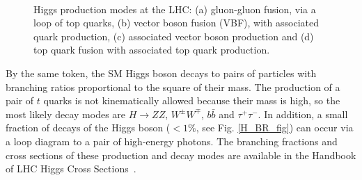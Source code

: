   \begin{figure}[h!]

  \centering
  \\
  \caption{Higgs production modes at the LHC: (a) gluon-gluon fusion, via a loop of top quarks, (b) vector boson fusion (VBF), with associated quark production, (c) associated vector boson production and (d) top quark fusion with associated top quark production. }
  \label{fig:theory:higgsproduction}
  \end{figure}

  \newpage
  By the same token, the SM Higgs boson decays to pairs of particles with branching ratios proportional to the square of their mass. The production of a pair of $t$ quarks is not kinematically allowed because their mass is high, so the most likely decay modes are $H \rightarrow ZZ \text{, } W^{\pm}W^{\mp}$, $ b\bar{b}$ and $ \tau^+ \tau^-$. In addition, a small fraction of decays of the Higgs boson ($<1\%$, see Fig. \ref{H_BR_fig}) can occur via a loop diagram to a pair of high-energy photons. The branching fractions and cross sections of these production and decay modes are available in the Handbook of LHC Higgs Cross Sections~\cite{H_XS1,H_XS2}.



